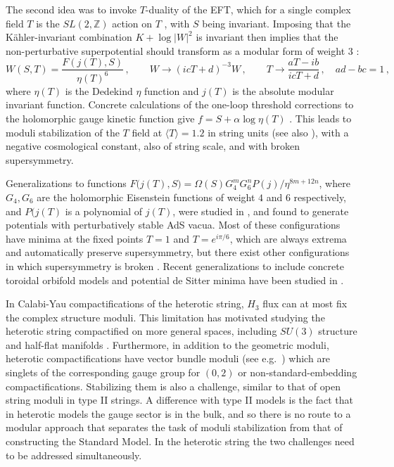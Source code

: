 \documentclass[12pt,a4wide]{article}
\def\be{\begin{equation}}
\def\ee{\end{equation}}
\begin{document}
The second idea was to invoke $T$-duality of the EFT, which for a single complex field $T$ is the $SL(2,\mathbb Z)$ action on $T$ \cite{Ferrara:1989qb, Font:1990nt,Ferrara:1990ei}, with $S$ being invariant. Imposing that the K\"ahler-invariant combination $K+\log|W|^2$ is invariant then implies that  the   non-perturbative superpotential should transform as a modular form of weight $3$ \cite{Font:1990nt,Ferrara:1990ei}:
\be
W(S,T)=\frac{F(j(T), S)}{\eta(T)^6}\,, \qquad W\rightarrow (icT+d)^{-3}W\,, \qquad T\rightarrow \frac{aT-ib}{icT+d}\,, \quad ad-bc=1\,,
\ee
where $\eta(T)$ is the Dedekind $\eta$ function and $j(T)$ is the absolute modular invariant function. Concrete calculations of the one-loop threshold  corrections to the
holomorphic gauge kinetic function give  $f=S+\alpha\log\eta(T)$ \cite{Dixon:1990pc}. This leads to moduli stabilization of the $T$ field at $\langle T\rangle=1.2$ \cite{Font:1990nt} in string units (see also \cite{Ferrara:1990ei}), with a negative cosmological constant, also of string scale, and with broken supersymmetry.

Generalizations to functions $F\bigl(j(T), S\bigr)=\Omega(S) G_4^m G_6^n P(j)/\eta^{8m+12n}$, where $G_4, G_6$ are the holomorphic Eisenstein functions of  weight $4$ and $6$ respectively, and $P(j(T)$ is a polynomial of $j(T)$, were studied in \cite{Cvetic:1991qm}, and found to generate potentials with  perturbatively stable AdS vacua. Most of these configurations have minima at the fixed points $T=1$ and 
$T=e^{i\pi/6}$, which are always extrema and automatically preserve supersymmetry, but there exist other configurations in which supersymmetry is broken \cite{Cvetic:1991qm}. Recent generalizations to include concrete toroidal orbifold models \cite{Parameswaran:2010ec} and potential de Sitter minima have been studied in \cite{Leedom:2022zdm,Knapp-Perez:2023nty}.

In Calabi-Yau  
compactifications of the heterotic string, $H_3$ flux
can at most fix the complex structure moduli.
This limitation has motivated studying the heterotic string compactified on more general spaces, including
$SU(3)$ structure and half-flat manifolds \cite{deCarlos:2005kh, Anderson:2011cza,Klaput:2012vv}. Furthermore, in addition to the geometric moduli, 
heterotic  compactifications have
vector bundle moduli (see e.g.~\cite{Buchbinder:2013dna}) 
which are singlets of the corresponding gauge group for $(0,2)$ or non-standard-embedding compactifications. Stabilizing them is also a challenge, similar to that of open string moduli in type II strings. 
A difference with type II models is the fact that in heterotic models the gauge sector is in the bulk, and so there is no route to a modular approach that separates the task of moduli stabilization from that of constructing the Standard Model.  In the heterotic string the two challenges need to be addressed simultaneously.
\end{document}
